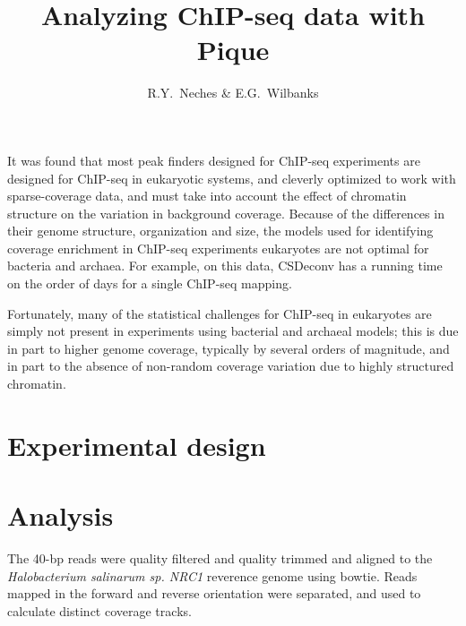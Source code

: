 \documentclass{article}
\author{R.Y.~Neches \& E.G.~Wilbanks}
\title{Analyzing ChIP-seq data with Pique}
\begin{document}
\maketitle

\newcommand{\imsize}{0.45\columnwidth}
\newcommand{\threeup}{0.26\columnwidth}
\newcommand{\cotwo}{$\text{CO}_{2}$}
\newcommand{\htwo}{$\text{H}_2$}
\newcommand{\otwo}{$\text{O}_2$}
\newcommand{\water}{$\text{H}_2\text{O}$}
\newcommand{\htwos}{$\text{H}_2\text{S}$}

\begin{abstract}
\end{abstract}

It was found that most peak finders designed for ChIP-seq experiments
are designed for ChIP-seq in eukaryotic systems, and cleverly
optimized to work with sparse-coverage data, and must take into
account the effect of chromatin structure on the variation in
background coverage. Because of the differences in their genome
structure, organization and size, the models used for identifying
coverage enrichment in ChIP-seq experiments eukaryotes are not optimal
for bacteria and archaea. For example, on this data, CSDeconv has a
running time on the order of days for a single ChIP-seq mapping.


Fortunately, many of the statistical challenges for ChIP-seq in
eukaryotes are simply not present in experiments using bacterial and
archaeal models; this is due in part to higher genome coverage,
typically by several orders of magnitude, and in part to the absence
of non-random coverage variation due to highly structured chromatin.

\section{Experimental design}



\section{Analysis}


The 40-bp reads were quality filtered and quality trimmed and aligned
to the {\em Halobacterium salinarum sp. NRC1} reverence genome using
bowtie. Reads mapped in the forward and reverse orientation were
separated, and used to calculate distinct coverage tracks.
\end{document}
